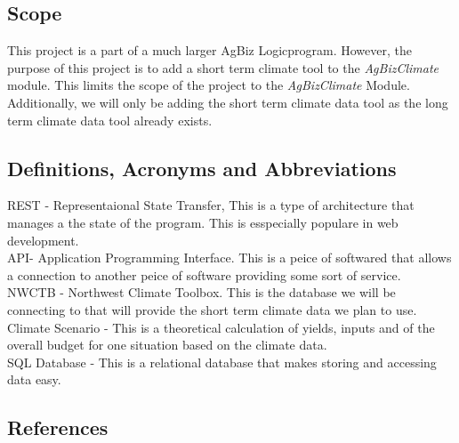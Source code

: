 \documentclass[onecolumn, draftclsnofoot,10pt, compsoc]{article}
\begin{document}
		\subsection{Scope}
			This project is a part of a much larger AgBiz Logic\texttrademark program. However, the purpose of this project is to add a short term climate tool to the \textit{AgBizClimate} module. This limits the scope of the project to the \textit{AgBizClimate} Module. Additionally, we will only be adding the short term climate data tool as the long term climate data tool already exists.\\

		\subsection{Definitions, Acronyms and Abbreviations}
			REST - Representaional State Transfer, This is a type of architecture that manages a the state of the program. This is esspecially populare in web development.\\
			API- Application Programming Interface. This is a peice of softwared that allows a connection to another peice of software providing some sort of service.\\
			NWCTB - Northwest Climate Toolbox. This is the database we will be connecting to that will provide the short term climate data we plan to use.\\
			Climate Scenario - This is a theoretical calculation of yields, inputs and of the overall budget for one situation based on the climate data.\\
			SQL Database - This is a relational database that makes storing and accessing data easy.\\

			\renewcommand\refname{\vskip -1cm}
		\subsection{References}

		\nocite{*}
    
    
\end{document}
